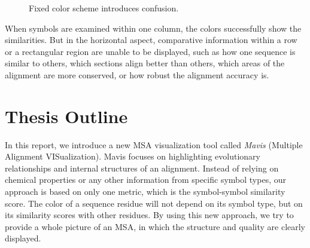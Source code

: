 \begin{figure}[hbt]
\centering
{}
\hspace{5mm}
\caption[Fixed Color Scheme Introduces Confusion]{Fixed color scheme introduces confusion.}\label{fig:intro1}
\end{figure}

When symbols are examined within one column, the colors successfully show the similarities. But in the horizontal aspect, comparative information within a row or a rectangular region are unable to be displayed, such as how one sequence is similar to others, which sections align better than others, which areas of the alignment are more conserved, or how robust the alignment accuracy is.

\section{Thesis Outline}

In this report, we introduce a new MSA visualization tool called \emph{Mavis} (Multiple Alignment VISualization). Mavis focuses on highlighting evolutionary relationships and internal structures of an alignment. Instead of relying on chemical properties or any other information from specific symbol types, our approach is based on only one metric, which is the symbol-symbol similarity score. The color of a sequence residue will not depend on its symbol type, but on its similarity scores with other residues. By using this new approach, we try to provide a whole picture of an MSA, in which the structure and quality are clearly displayed.

